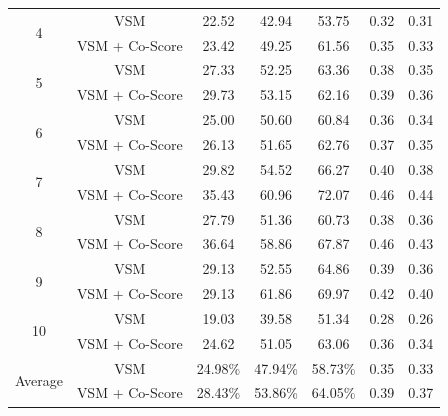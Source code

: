 \documentclass[conference]{IEEEtran}
\begin{document}
\begin{table}[htbp]
{\begin{tabular}{c|c|c|c|c|c|c}
			\multirow{2}{*}{4}                                                                               & VSM & 22.52 & 42.94 & 53.75 & 0.32 & 0.31 \\   \cline{2-7} &VSM + Co-Score                                                                      & 23.42                       & 49.25                       & 61.56                                                &  0.35   &  0.33  \\  \hline
			\multirow{2}{*}{5}                                                                               & VSM & 27.33 & 52.25 & 63.36 & 0.38 & 0.35 \\   \cline{2-7} &VSM + Co-Score                                                                       & 29.73                                                 & 53.15                                                 & 62.16                                                  &  0.39   & 0.36     \\  \hline
			\multirow{2}{*}{6}                                                                               & VSM & 25.00 & 50.60 & 60.84 & 0.36 & 0.34 \\  \cline{2-7}  &VSM + Co-Score 
			&26.13 &
			51.65 &
			62.76 & 0.37 &
			0.35     \\  \hline 
			\multirow{2}{*}{7}                                                                               & VSM & 29.82 & 54.52 & 66.27 & 0.40 & 0.38 \\  \cline{2-7}  &VSM + Co-Score 
			
			&35.43 &
			60.96 &
			72.07 & 0.46 &
			0.44     \\  \hline
			\multirow{2}{*}{8}                                                                               & VSM & 27.79 & 51.36 & 60.73 & 0.38 & 0.36 \\  \cline{2-7}  &VSM + Co-Score 
			&36.64 &
			58.86 &
			67.87 & 0.46 &
			0.43    \\  \hline
			\multirow{2}{*}{9}                                                                               & VSM & 29.13 & 52.55 & 64.86 & 0.39 & 0.36 \\  \cline{2-7}   &VSM + Co-Score 
			&29.13 &
			61.86 &
			69.97 & 0.42 &
			0.40    \\  \hline
			\multirow{2}{*}{10}                                                                               & VSM & 19.03 & 39.58 & 51.34 & 0.28 & 0.26 \\  \cline{2-7}  &VSM + Co-Score
			&24.62 &
			51.05 &
			63.06 & 0.36 &
			0.34    \\ \hline \hline
			\multirow{2}{*}{Average}                                                                               & VSM & 24.98\% & 47.94\% & 58.73\% & 0.35 & 0.33 \\  \cline{2-7}   &VSM + Co-Score      & 28.43\%                                                 & 53.86\%                                                 & 64.05\%                                                  &   0.39  &  0.37    \\ 
			\hline
	\end{tabular}}
\centering
\end{table}
\end{document}
